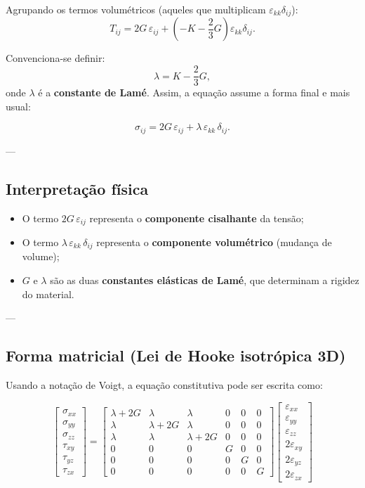 Agrupando os termos volumétricos (aqueles que multiplicam $\varepsilon_{kk}\delta_{ij}$):
\[
T_{ij} = 2G\,\varepsilon_{ij} + \left(-K - \frac{2}{3}G\right)\varepsilon_{kk}\delta_{ij}.
\]

Convenciona-se definir:
\[
\lambda = K - \frac{2}{3}G,
\]
onde $\lambda$ é a \textbf{constante de Lamé}. Assim, a equação assume a forma final e mais usual:

\[
\sigma_{ij} = 2G\,\varepsilon_{ij} + \lambda\,\varepsilon_{kk}\,\delta_{ij}.
\]

---

\subsection*{Interpretação física}

\begin{itemize}
    \item O termo $2G\,\varepsilon_{ij}$ representa o \textbf{componente cisalhante} da tensão;
    \item O termo $\lambda\,\varepsilon_{kk}\,\delta_{ij}$ representa o \textbf{componente volumétrico} (mudança de volume);
    \item $G$ e $\lambda$ são as duas \textbf{constantes elásticas de Lamé}, que determinam a rigidez do material.
\end{itemize}

---

\subsection*{Forma matricial (Lei de Hooke isotrópica 3D)}

Usando a notação de Voigt, a equação constitutiva pode ser escrita como:

\[
\begin{bmatrix}
\sigma_{xx} \\[4pt]
\sigma_{yy} \\[4pt]
\sigma_{zz} \\[4pt]
\tau_{xy} \\[4pt]
\tau_{yz} \\[4pt]
\tau_{zx}
\end{bmatrix}
=
\begin{bmatrix}
\lambda + 2G & \lambda & \lambda & 0 & 0 & 0 \\[4pt]
\lambda & \lambda + 2G & \lambda & 0 & 0 & 0 \\[4pt]
\lambda & \lambda & \lambda + 2G & 0 & 0 & 0 \\[4pt]
0 & 0 & 0 & G & 0 & 0 \\[4pt]
0 & 0 & 0 & 0 & G & 0 \\[4pt]
0 & 0 & 0 & 0 & 0 & G
\end{bmatrix}
\begin{bmatrix}
\varepsilon_{xx} \\[4pt]
\varepsilon_{yy} \\[4pt]
\varepsilon_{zz} \\[4pt]
2\varepsilon_{xy} \\[4pt]
2\varepsilon_{yz} \\[4pt]
2\varepsilon_{zx}
\end{bmatrix}
\]

